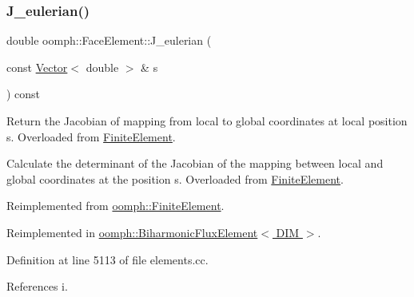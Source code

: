 \subsubsection{\texorpdfstring{J\+\_\+eulerian()}{J\_eulerian()}}
{\footnotesize\ttfamily double oomph\+::\+Face\+Element\+::\+J\+\_\+eulerian (\begin{DoxyParamCaption}\item[{const \hyperlink{classoomph_1_1Vector}{Vector}$<$ double $>$ \&}]{s }\end{DoxyParamCaption}) const\hspace{0.3cm}{\ttfamily [virtual]}}



Return the Jacobian of mapping from local to global coordinates at local position s. Overloaded from \hyperlink{classoomph_1_1FiniteElement}{Finite\+Element}. 

Calculate the determinant of the Jacobian of the mapping between local and global coordinates at the position s. Overloaded from \hyperlink{classoomph_1_1FiniteElement}{Finite\+Element}. 

Reimplemented from \hyperlink{classoomph_1_1FiniteElement_a089e58d5ad9b8efee637221b0e264563}{oomph\+::\+Finite\+Element}.



Reimplemented in \hyperlink{classoomph_1_1BiharmonicFluxElement_af47fac27f81814b471df73b8c956a63e}{oomph\+::\+Biharmonic\+Flux\+Element$<$ D\+I\+M $>$}.



Definition at line 5113 of file elements.\+cc.



References i.



